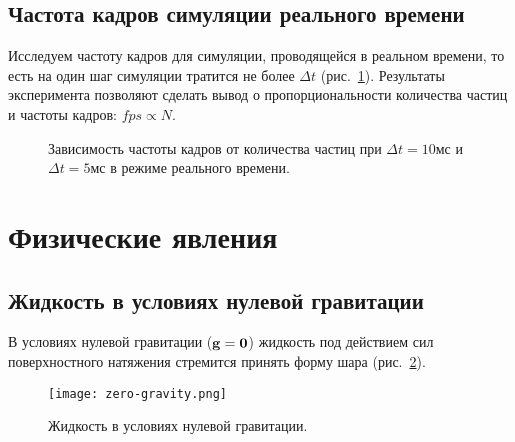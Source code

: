 \subsection{Частота кадров симуляции реального времени}
Исследуем частоту кадров для симуляции, проводящейся в реальном времени, то есть на один шаг симуляции тратится не более $\Delta t$ (рис.~\ref{fig:fps-graph}). Результаты эксперимента позволяют сделать вывод о пропорциональности количества частиц и частоты кадров: $fps\propto N$.

\begin{figure}[h]
  \centering

  \resizebox{.45\textwidth}{!} {
  }%
  \resizebox{.45\textwidth}{!} {
  }
  \caption{Зависимость частоты кадров от количества частиц при $\Delta t=10$мс и $\Delta t=5$мс в режиме реального времени.}
  \label{fig:fps-graph}
\end{figure}


\section{Физические явления}
\subsection{Жидкость в условиях нулевой гравитации}
В условиях нулевой гравитации ($\boldsymbol{\mathbf{g}}=\boldsymbol{\mathbf{0}}$) жидкость под действием сил поверхностного натяжения стремится принять форму шара (рис.~\ref{fig:zero-gravity}).

\begin{figure}[h]
  \centering
  \texttt{[image: zero-gravity.png]}
  \caption{Жидкость в условиях нулевой гравитации.}
  \label{fig:zero-gravity}
\end{figure}
